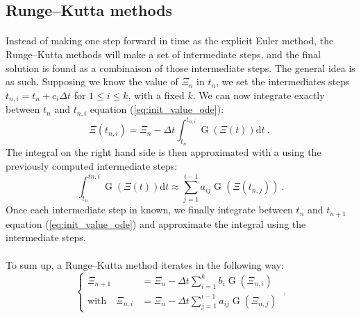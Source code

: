       \subsection{Runge--Kutta methods}

        \paragraph{}
        Instead of making one step forward in time as the explicit Euler method, the Runge--Kutta methods will make a set of intermediate steps, and the final solution is found as a combinaison of those intermediate steps.
        The general idea is as such.
        Supposing we know the value of $\Xi_n$ in $t_n$, we set the intermediates steps $t_{n, i} = t_n + c_i\Delta t$ for $1 \leq i \leq k$, with a fixed $k$.
        We can now integrate exactly between $t_n$ and $t_{n, i}$ equation (\ref{eq:init_value_ode}):
        \begin{equation}
          \Xi\left(t_{n, i}\right) = \Xi_n - \Delta t \int_{t_n}^{t_{n,i}} \operatorname{G}\left(\Xi\left(t\right)\right) \mathrm{d}t\ .\
        \end{equation}
        The integral on the right hand side is then approximated with a  using the previously computed intermediate steps:
        \begin{equation}
          \int_{t_n}^{t{n,i}} \operatorname{G}\left(\Xi\left(t\right)\right) \mathrm{d}t \approx \sum_{j = 1}^{i-1} a_{ij} \operatorname{G}\left(\Xi\left(t_{n,j}\right)\right) \ .
        \end{equation}
        Once each intermediate step in known, we finally integrate between $t_n$ and $t_{n+1}$ equation (\ref{eq:init_value_ode}) and approximate the integral using the intermediate steps.

        \paragraph{}
        To sum up, a Runge--Kutta method iterates in the following way:
        \begin{equation}
          \left\{\begin{aligned}
            \Xi_{n+1} &= \Xi_n - \Delta t \sum_{i = 1}^k b_i \operatorname{G}\left(\Xi_{n,i}\right) \\
            \textrm{with}\quad \Xi_{n,i} &= \Xi_n - \Delta t \sum_{j = 1}^{i-1} a_{ij} \operatorname{G}\left(\Xi_{n,j}\right)
          \end{aligned}\right. \ .
        \end{equation}

